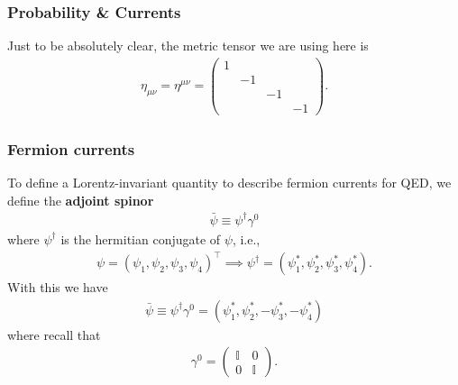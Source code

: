 \documentclass{book}
\theoremstyle{definition}
\begin{document}
\subsubsection{Probability \& Currents}

Just to be absolutely clear, the metric tensor we are using here is
\begin{align}
\eta_{\mu\nu} = \eta^{\mu\nu} = \begin{pmatrix}
1 &&& \\
&-1&&\\
&&-1&\\
&&&-1
\end{pmatrix}.
\end{align}


 
 
 

\subsubsection{Fermion currents}



To define a Lorentz-invariant quantity to describe fermion currents for QED, we define the \textbf{adjoint spinor}
\begin{align}
\boxed{\bar{\psi} \equiv \psi^\dagger \gamma^0}
\end{align}
where $\psi^\dagger$ is the hermitian conjugate of $\psi$, i.e.,
\begin{align}
\psi = (\psi_1,\psi_2,\psi_3,\psi_4)^\top \implies \psi^\dagger = (\psi_1^*, \psi_2^*, \psi_3^*,\psi_4^*).
\end{align}
With this we have
\begin{align}
\boxed{\bar{\psi} \equiv \psi^\dagger \gamma^0 = (\psi_1^*,\psi_2^*, -\psi_3^*, -\psi_4^*)}
\end{align}
where recall that
\begin{align}
\gamma^0 = \begin{pmatrix}
\mathbb{I} & 0 \\ 0 & \mathbb{I}
\end{pmatrix}.
\end{align}
\end{document}
